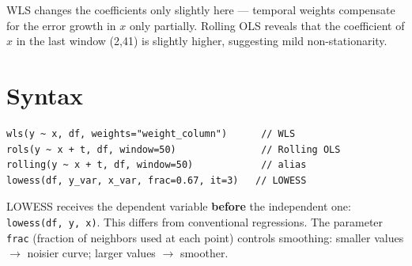 WLS changes the coefficients only slightly here — temporal weights compensate for
the error growth in $x$ only partially. Rolling OLS reveals that the
coefficient of $x$ in the last window (2{,}41) is slightly higher, suggesting
mild non-stationarity.

\section{Syntax}

\begin{lstlisting}
wls(y ~ x, df, weights="weight_column")      // WLS
rols(y ~ x + t, df, window=50)               // Rolling OLS
rolling(y ~ x + t, df, window=50)            // alias
lowess(df, y_var, x_var, frac=0.67, it=3)   // LOWESS
\end{lstlisting}

\begin{nota}
  LOWESS receives the dependent variable \textbf{before} the
  independent one: \texttt{lowess(df, y, x)}. This differs from
  conventional regressions. The parameter \texttt{frac} (fraction of neighbors used at
  each point) controls smoothing: smaller values $\to$ noisier curve;
  larger values $\to$ smoother.
\end{nota}
